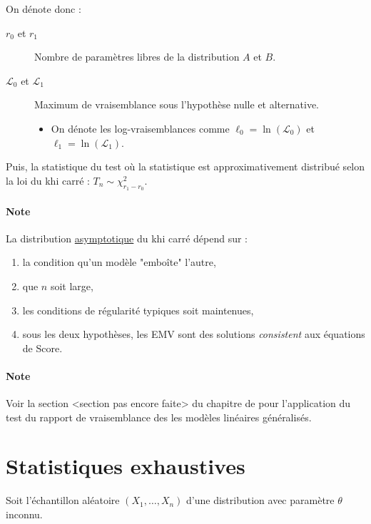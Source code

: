 \documentclass[french]{article}
\begin{document}
\begin{multicols*}{2}
\begin{definitionNOHFILL}
\bigskip

On dénote donc : 
\begin{description}
	\item[$r_{0}$ et $r_{1}$]	Nombre de paramètres libres de la distribution $A$ et $B$.
	\item[$\mathcal{L}_{0}$ et $\mathcal{L}_{1}$]	Maximum de vraisemblance sous l'hypothèse nulle et alternative.
		\begin{itemize}
		\item	On dénote les log-vraisemblances comme $\ell_{0} = \ln(\mathcal{L}_{0})$ et $\ell_{1} = \ln(\mathcal{L}_{1})$.
		\end{itemize}
\end{description}

Puis, la statistique du test  où la statistique est approximativement distribué selon la loi du khi carré : $T_{n} \sim \chi^{2}_{r_{1} - r_{0}}$. 
\end{definitionNOHFILL}


\paragraph{Note}	La distribution \underline{asymptotique} du khi carré dépend sur : 
\begin{enumerate}[label = \circled{\arabic*}{trueblue}]
	\item	la condition qu'un modèle "emboîte" l'autre, 
	\item	que $n$ soit large,
	\item	les conditions de régularité typiques soit maintenues,
	\item	sous les deux hypothèses, les EMV sont des solutions \og \textit{consistent} \fg{} aux équations de Score.
\end{enumerate}


\bigskip

\paragraph{Note}	Voir la section <section pas encore faite> du chapitre de \textit{\underline{}} pour l'application du test du rapport de vraisemblance des les modèles linéaires généralisés.




\newpage
\section{Statistiques exhaustives}\label{sec:exhStat}
Soit l'échantillon aléatoire $(X_{1}, \dots, X_{n})$ d'une distribution avec paramètre $\theta$ inconnu.


\end{multicols*}
\end{document}

